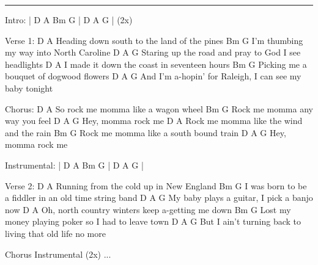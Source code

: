 \noindent\rule{\columnwidth}{1pt}

\begin{lstsong}
Intro: | D  A  Bm  G | D  A  G | (2x)

Verse 1:
 D                         A
Heading down south to the land of the pines
    Bm                    G
I'm thumbing my way into North Caroline
  D                      A                 G
Staring up the road and pray to God I see headlights
  D                          A
I made it down the coast in seventeen hours
Bm                       G
Picking me a bouquet of dogwood flowers
          D                          A             G
And I'm a-hopin' for Raleigh, I can see my baby tonight

Chorus:
    D                    A
So rock me momma like a wagon wheel
Bm                G
Rock me momma any way you feel
 D  A        G
Hey,  momma rock me
 D                      A
Rock me momma like the wind and the rain
 Bm                   G
Rock me momma like a south bound train
 D  A        G
Hey,  momma rock me

Instrumental: | D  A  Bm  G | D  A  G |

Verse 2:
 D                    A
Running from the cold up in New England
      Bm                         G
I was born to be a fiddler in an old time string band
   D                   A               G
My baby plays a guitar, I pick a banjo now
     D                            A
Oh, north country winters keep a-getting me down
         Bm                       G
Lost my money playing poker so I had to leave town
      D                      A                   G
But I ain't turning back to living that old life no more

Chorus
Instrumental (2x)
...
\end{lstsong}
\newpage

